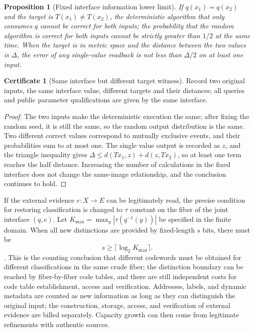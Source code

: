 \documentclass[11pt,a4paper]{article}
\theoremstyle{plain}
\newtheorem{proposition}[theorem]{Proposition}
\theoremstyle{definition}
\newtheorem*{certificate}{Certificate}
\theoremstyle{remark}
\begin{document}
\begin{CJK*}
\begin{proposition}
[Fixed interface information lower limit]\label{pc:information-limit}
If $q(x_1)=q(x_2)$ and the target is $T(x_1)\ne T(x_2)$, the deterministic algorithm that only consumes $q$ cannot be correct for both inputs; the probability that the random algorithm is correct for both inputs cannot be strictly greater than $1/2$ at the same time. When the target is in metric space and the distance between the two values is $\Delta$, the error of any single-value readback is not less than $\Delta/2$ on at least one input.\end{proposition}
\begin{certificate}
[Same interface but different target witness]Record two original inputs, the same interface value, different targets and their distances; all queries and public parameter qualifications are given by the same interface.\end{certificate}
\begin{proof}
The two inputs make the deterministic execution the same; after fixing the random seed, it is still the same, so the random output distribution is the same. Two different correct values correspond to mutually exclusive events, and their probabilities sum to at most one. The single value output is recorded as $z$, and the triangle inequality gives $\Delta\le d(Tx_1,z)+d(z,Tx_2)$, so at least one term reaches the half distance. Increasing the number of calculations in the fixed interface does not change the same-image relationship, and the conclusion continues to hold.\end{proof}


If the external evidence $e:X\to E$ can be legitimately read, the precise condition for restoring classification is changed to $\tau$ constant on the fiber of the joint interface $(q,e)$. Let $K_{\max}=\max_y|\tau(q^{-1}(y))|$ be specified in the finite domain. When all new distinctions are provided by fixed-length $s$ bits, there must be \[
 s\ge\lceil\log_2K_{\max}\rceil.
\]. This is the counting conclusion that different codewords must be obtained for different classifications in the same crude fiber; the distinction boundary can be reached by fiber-by-fiber code tables, and there are still independent costs for code table establishment, access and verification. Addresses, labels, and dynamic metadata are counted as new information as long as they can distinguish the original input; the construction, storage, access, and verification of external evidence are billed separately. Capacity growth can then come from legitimate refinements with authentic sources.


\end{CJK*}
\end{document}
